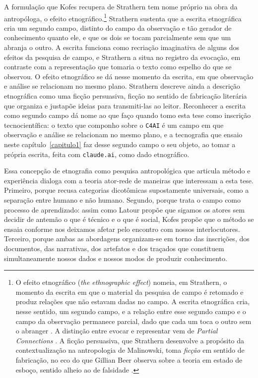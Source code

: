 A formulação que Kofes recupera de Strathern tem nome próprio na obra da antropóloga, o efeito etnográfico.\footnote{O efeito etnográfico (\textit{the ethnographic effect}) nomeia, em Strathern, o momento da escrita em que o material da pesquisa de campo é retomado e produz relações que não estavam dadas no campo. A escrita etnográfica cria, nesse sentido, um segundo campo, e a relação entre esse segundo campo e o campo da observação permanece parcial, dado que cada um toca o outro sem o abranger \parencite[pp.~7, 345]{strathern2014efeito}. A distinção entre evocar e representar vem de \textit{Partial Connections} \parencite[p.~7]{strathern2005partial}. A ficção persuasiva, que Strathern desenvolve a propósito da contextualização na antropologia de Malinowski, toma \textit{ficção} em sentido de fabricação, no eco do que Gillian Beer observa sobre a teoria em estado de esboço, sentido alheio ao de falsidade \parencite[p.~173]{strathern2014efeito}.} Strathern sustenta que a escrita etnográfica cria um segundo campo, distinto do campo da observação e tão gerador de conhecimento quanto ele, e que os dois se tocam parcialmente sem que um abranja o outro. A escrita funciona como recriação imaginativa de alguns dos efeitos da pesquisa de campo, e Strathern a situa no registro da evocação, em contraste com a representação que tomaria o texto como espelho do que se observou. O efeito etnográfico se dá nesse momento da escrita, em que observação e análise se relacionam no mesmo plano. Strathern descreve ainda a descrição etnográfica como uma ficção persuasiva, ficção no sentido de fabricação literária que organiza e justapõe ideias para transmiti-las ao leitor. Reconhecer a escrita como segundo campo dá nome ao que faço quando tomo esta tese como inscrição tecnocientífica: o texto que componho sobre o \texttt{C4AI} é um campo em que observação e análise se relacionam no mesmo plano, e a tecnografia que ensaio neste capítulo~\ref{capitulo1} faz desse segundo campo o seu objeto, ao tomar a própria escrita, feita com \texttt{claude.ai}, como dado etnográfico.

Essa concepção de etnografia como pesquisa antropológica que articula método e experiência dialoga com a teoria ator-rede de maneiras que interessam a esta tese. Primeiro, porque recusa categorias dicotômicas supostamente universais, como a separação entre humano e não humano. Segundo, porque trata o campo como processo de aprendizado: assim como Latour propõe que sigamos os atores sem decidir de antemão o que é técnico e o que é social, Kofes propõe que o método se ensaia conforme nos deixamos afetar pelo encontro com nossos interlocutores. Terceiro, porque ambas as abordagens organizam-se em torno das inscrições, dos documentos, das narrativas, dos artefatos e dos traçados que constituem simultaneamente nossos dados e nossos modos de produzir conhecimento.

